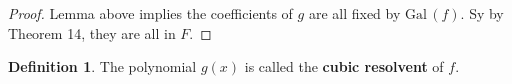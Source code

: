 \documentclass{article}
\theoremstyle{definition}
\newtheorem{dfn}{Definition}
\newcommand{\Gal}{\text{Gal}\,}
\begin{document}
\begin{proof}
	Lemma above implies the coefficients of $g$ are all fixed by $\Gal(f)$.
	Sy by Theorem 14, they are all in $F$.
\end{proof}

\begin{dfn}
	The polynomial $g(x)$ is called the \textbf{cubic resolvent} of $f$.
\end{dfn}
\end{document}
